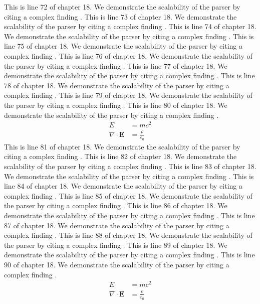 This is line 72 of chapter 18. We demonstrate the scalability of the parser by citing a complex finding \cite{ref18_72}.
This is line 73 of chapter 18. We demonstrate the scalability of the parser by citing a complex finding \cite{ref18_73}.
This is line 74 of chapter 18. We demonstrate the scalability of the parser by citing a complex finding \cite{ref18_74}.
This is line 75 of chapter 18. We demonstrate the scalability of the parser by citing a complex finding \cite{ref18_75}.
This is line 76 of chapter 18. We demonstrate the scalability of the parser by citing a complex finding \cite{ref18_76}.
This is line 77 of chapter 18. We demonstrate the scalability of the parser by citing a complex finding \cite{ref18_77}.
This is line 78 of chapter 18. We demonstrate the scalability of the parser by citing a complex finding \cite{ref18_78}.
This is line 79 of chapter 18. We demonstrate the scalability of the parser by citing a complex finding \cite{ref18_79}.
This is line 80 of chapter 18. We demonstrate the scalability of the parser by citing a complex finding \cite{ref18_80}.
\begin{align*}
  E &= mc^2 \\
  \nabla \cdot \mathbf{E} &= \frac{\rho}{\varepsilon_0}
\end{align*}
This is line 81 of chapter 18. We demonstrate the scalability of the parser by citing a complex finding \cite{ref18_81}.
This is line 82 of chapter 18. We demonstrate the scalability of the parser by citing a complex finding \cite{ref18_82}.
This is line 83 of chapter 18. We demonstrate the scalability of the parser by citing a complex finding \cite{ref18_83}.
This is line 84 of chapter 18. We demonstrate the scalability of the parser by citing a complex finding \cite{ref18_84}.
This is line 85 of chapter 18. We demonstrate the scalability of the parser by citing a complex finding \cite{ref18_85}.
This is line 86 of chapter 18. We demonstrate the scalability of the parser by citing a complex finding \cite{ref18_86}.
This is line 87 of chapter 18. We demonstrate the scalability of the parser by citing a complex finding \cite{ref18_87}.
This is line 88 of chapter 18. We demonstrate the scalability of the parser by citing a complex finding \cite{ref18_88}.
This is line 89 of chapter 18. We demonstrate the scalability of the parser by citing a complex finding \cite{ref18_89}.
This is line 90 of chapter 18. We demonstrate the scalability of the parser by citing a complex finding \cite{ref18_90}.
\begin{align*}
  E &= mc^2 \\
  \nabla \cdot \mathbf{E} &= \frac{\rho}{\varepsilon_0}
\end{align*}
